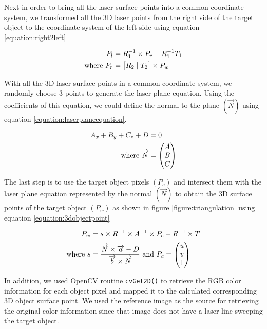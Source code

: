 Next in order to bring all the laser surface points into a common coordinate
system, we transformed all the 3D laser points from the right side of the
target object to the coordinate system of the left side using equation
\ref{equation:right2left}

\begin{align}
	\label{equation:right2left}
	P_{l} &= R_1^{-1} \times P_{r} - R_1^{-1}T_1 \\
	\text{where}~
	P_{r} &= \begin{bmatrix}
									R_2 \mid T_2
 				  \end{bmatrix} \times P_w \notag
\end{align}

With all the 3D laser surface points in a common coordinate system, we
randomly choose 3 points to generate the laser plane equation. Using the
coefficients of this equation, we could define the normal to the plane
$(\overrightarrow{N})$ using equation \ref{equation:laserplaneequation}.

\begin{align}
	\label{equation:laserplaneequation}
	A_x + B_y + C_z + D &= 0 \\
	\text{where}~
	 \overrightarrow{N} &=
	 \begin{pmatrix}
	  A \\
	  B \\
	  C \\
	 \end{pmatrix} \notag
\end{align}

The last step is to use the target object pixels $(P_c)$ and intersect them
with the laser plane equation represented by the normal $(\overrightarrow{N})$
to obtain the 3D surface points of the target object $(P_w)$ as shown in
figure \ref{figure:triangulation} using equation \ref{equation:3dobjectpoint}

\begin{align}
	\label{equation:3dobjectpoint}
	P_w &= s \times R^{-1}
 					 \times A^{-1}
					 \times P_c
					- R^{-1} \times T \\
	\text{where}~
	s &= \frac{\overrightarrow{N}\times\overrightarrow{a} - D}
						{\overrightarrow{b}\times\overrightarrow{N}}
  ~\text{and}~ P_c = \begin{pmatrix}
												u \\
												v \\
												1 \\
										 \end{pmatrix} \notag
\end{align}

In addition, we used OpenCV routine \texttt{cvGet2D()} to retrieve the RGB
color information for each object pixel and mapped it to the calculated
corresponding 3D object surface point. We used the reference image as the
source for retrieving the original color information since that image does not
have a laser line sweeping the target object.
